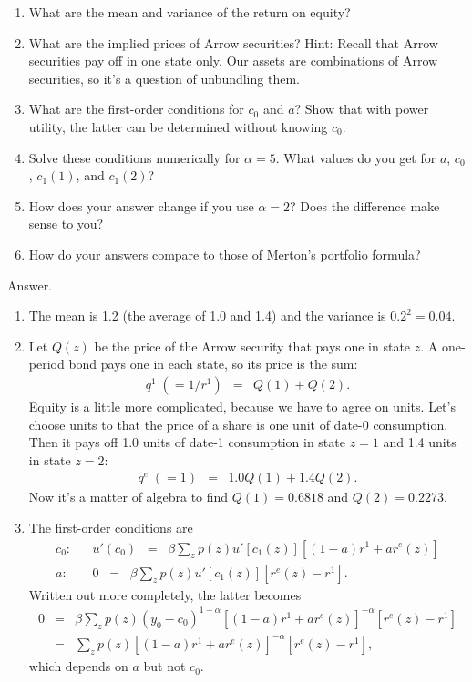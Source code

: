 \begin{enumerate}
\begin{enumerate}
\item What are the mean and variance of the return on equity?
\item What are the implied prices of Arrow securities?
Hint:  Recall that Arrow securities pay off in one state only.
Our assets are combinations of Arrow securities,
so it's a question of unbundling them.
\item What are the first-order conditions for $c_0$ and $a$?
Show that with power utility,
the latter can be determined without knowing $c_0$.
\item Solve these conditions numerically for $\alpha = 5$.
What values do you get for $a$, $c_0$, $c_1(1)$, and $c_1(2)$?
\item How does your answer change if you use $\alpha = 2$?
Does the difference make sense to you?
\item How do your answers compare to those of Merton's portfolio formula?
\end{enumerate}
%
Answer.
\begin{enumerate}
\item The mean is 1.2 (the average of 1.0 and 1.4)
and the variance is $0.2^2 = 0.04$.

\item
Let $Q(z)$ be the price of the Arrow security that pays one
in state $z$.
A one-period bond pays one in each state, so its price is the sum:
\begin{eqnarray*}
    q^1 \; (=1/r^1)  &=&  Q(1) + Q(2)  .
\end{eqnarray*}
Equity is a little more complicated, because we have to agree on
units.  Let's choose units to that the price of a share is one
unit of date-0 consumption.
Then it pays off 1.0 units of date-1 consumption in state $z=1$
and 1.4 units in state $z=2$:
\begin{eqnarray*}
    q^e \; (=1)  &=&  1.0 Q(1) + 1.4 Q(2)  .
\end{eqnarray*}
Now it's a matter of algebra to find
$Q(1) = 0.6818$ and $Q(2) = 0.2273$.


\item The first-order conditions are
\begin{eqnarray*}
    c_0:  &&  u'(c_0) \;\;=\;\; \beta \sum_z p(z)
            u'[c_1(z)] [ (1-a)r^1 + a r^e(z)] \\
    a:    && 0 \;\;=\;\; \beta \sum_z p(z) u'[c_1(z)] [r^e(z) - r^1 ]  .
\end{eqnarray*}
Written out more completely, the latter becomes
\begin{eqnarray*}
    0 &=& \beta \sum_z p(z) (y_0-c_0)^{1-\alpha} [ (1-a)r^1 + a r^e(z)]^{-\alpha} [r^e(z) - r^1 ] \\
    &=&  \sum_z p(z) [ (1-a)r^1 + a r^e(z)]^{-\alpha} [r^e(z) - r^1 ] ,
\end{eqnarray*}
which depends on $a$ but not $c_0$.


\end{enumerate}
\end{enumerate}
